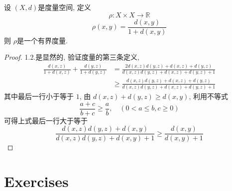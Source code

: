 \documentclass[../main.tex]{subfiles}
\begin{document}
\begin{exercise}{}{}
    设 \(  \left( X,d \right)   \)是度量空间, 定义 \[
    \rho :X\times X\to \mathbb{R} 
    \] \[
    \rho \left( x,y \right)= \frac{d\left( x,y \right)  }{1+ d\left( x,y \right)  }  
    \]则 \(  \rho   \)是一个有界度量.  
\end{exercise}
\begin{proof}
    1.2.是显然的, 验证度量的第三条定义,  \[
    \begin{aligned}
    \frac{d\left( x,z \right)  }{1+ d\left( x,z \right)  }+ \frac{d\left( y,z \right)  }{1+ d\left( y,z \right)  }&= \frac{2d\left( x,z \right)d\left( y,z \right)  + d\left( x,z \right)+ d\left( y,z \right)    }{d\left( x,z \right)d\left( y,z \right)+ d\left( x,z \right)+ d\left( y,z \right)+ 1      }   \\ 
    & \ge \frac{d\left( x,z \right)d\left( y,z \right)+ d\left( x,z \right)+ d\left( y,z \right)     }{d\left( x,z \right)d\left( y,z \right)+ d\left( x,z \right)+ d\left( y,z \right)+ 1     }  
    \end{aligned}
    \]其中最后一行小于等于 \(  1  \), 由 \(  d\left( x,z \right)+ d\left( y,z \right)\ge d\left( x,y \right)     \), 利用不等式 \[
    \frac{a+ c }{b+ c }\ge \frac{a }{b },\quad (0< a\le b  , c\ge 0)
    \]可得上式最后一行大于等于 \[
    \frac{d\left( x,z \right)d\left( y,z \right)+ d\left( x,y \right)    }{d\left( x,z \right)d\left( y,z \right)+ d\left( x,y \right)+ 1    } \ge \frac{d\left( x,y \right)  }{d\left( x,y \right)+ 1  }  
    \]  
\end{proof}
\section{Exercises}
\end{document}
